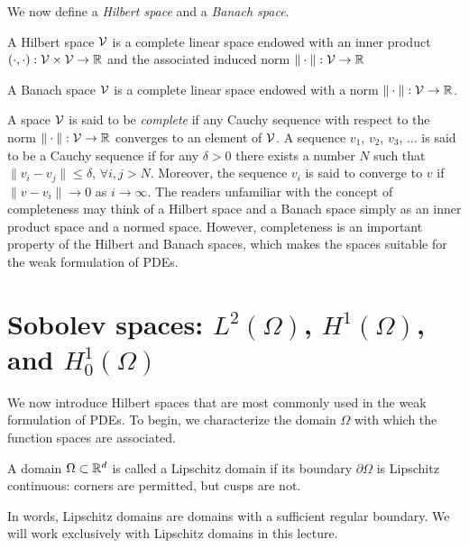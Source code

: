 We now define a \emph{Hilbert space} and a \emph{Banach space}.
\begin{definition}
  A Hilbert space $\mathcal{V}$ is a complete linear space endowed with an inner product $(\cdot,\cdot): \mathcal{V} \times \mathcal{V} \to \mathbb{R}$ and the associated induced norm $\| \cdot \|: \mathcal{V} \to \mathbb{R}$ 
\end{definition}
\begin{definition}
  A Banach space $\mathcal{V}$ is a complete linear space endowed with a norm $\| \cdot \|: \mathcal{V} \to \mathbb{R}$.
\end{definition}
A space $\mathcal{V}$ is said to be \emph{complete} if any Cauchy sequence with respect to the norm $\| \cdot \|: \mathcal{V} \to \mathbb{R}$ converges to an element of $\mathcal{V}$.  A sequence $v_1$, $v_2$, $v_3$, $\dots$ is said to be a Cauchy sequence if for any $\delta > 0$ there exists a number $N$ such that $\| v_i - v_j \| \leq \delta$, $\forall i,j  > N$.  Moreover, the sequence $v_i$ is said to converge to $v$ if $\| v - v_i \| \to 0$ as $i \to \infty$. The readers unfamiliar with the concept of completeness may think of a Hilbert space and a Banach space simply as an inner product space and a normed space. However, completeness is an important property of the Hilbert and Banach spaces, which makes the spaces suitable for the weak formulation of PDEs.

\section{Sobolev spaces: $L^2(\Omega)$, $H^1(\Omega)$, and $H^1_0(\Omega)$}
\label{sec:posnd_sobolev}
We now introduce Hilbert spaces that are most commonly used in the weak formulation of PDEs. To begin, we characterize the domain $\Omega$ with which the function spaces are associated.
\begin{definition}
  A domain $\Omega \subset \mathbb{R}^d$ is called a Lipschitz domain if its boundary $\partial \Omega$ is Lipschitz continuous: corners are permitted, but cusps are not.
\end{definition}
In words, Lipschitz domains are domains with a sufficient regular boundary. We will work exclusively with Lipschitz domains in this lecture.

